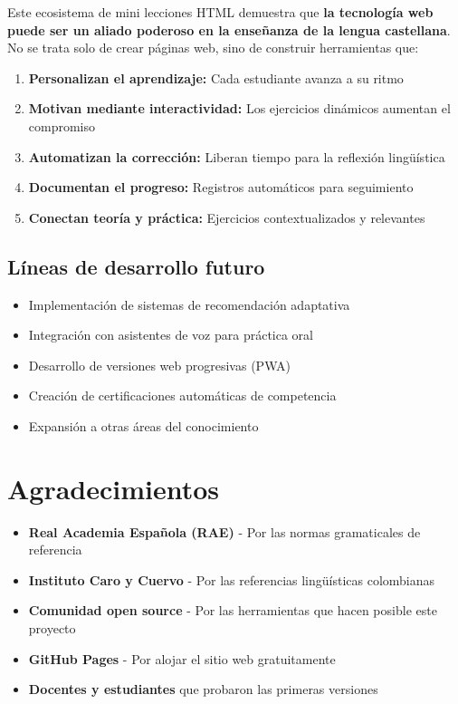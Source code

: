 \documentclass[12pt,spanish]{article}
\begin{document}
Este ecosistema de mini lecciones HTML demuestra que \textbf{la tecnología web puede ser un aliado poderoso en la enseñanza de la lengua castellana}. No se trata solo de crear páginas web, sino de construir herramientas que:

\begin{enumerate}
    \item \textbf{Personalizan el aprendizaje:} Cada estudiante avanza a su ritmo
    \item \textbf{Motivan mediante interactividad:} Los ejercicios dinámicos aumentan el compromiso
    \item \textbf{Automatizan la corrección:} Liberan tiempo para la reflexión lingüística
    \item \textbf{Documentan el progreso:} Registros automáticos para seguimiento
    \item \textbf{Conectan teoría y práctica:} Ejercicios contextualizados y relevantes
\end{enumerate}

\subsection{Líneas de desarrollo futuro}

\begin{itemize}
    \item Implementación de sistemas de recomendación adaptativa
    \item Integración con asistentes de voz para práctica oral
    \item Desarrollo de versiones web progresivas (PWA)
    \item Creación de certificaciones automáticas de competencia
    \item Expansión a otras áreas del conocimiento
\end{itemize}

\section{Agradecimientos}

\begin{itemize}
    \item \textbf{Real Academia Española (RAE)} - Por las normas gramaticales de referencia
    \item \textbf{Instituto Caro y Cuervo} - Por las referencias lingüísticas colombianas
    \item \textbf{Comunidad open source} - Por las herramientas que hacen posible este proyecto
    \item \textbf{GitHub Pages} - Por alojar el sitio web gratuitamente
    \item \textbf{Docentes y estudiantes} que probaron las primeras versiones
\end{itemize}
\end{document}
